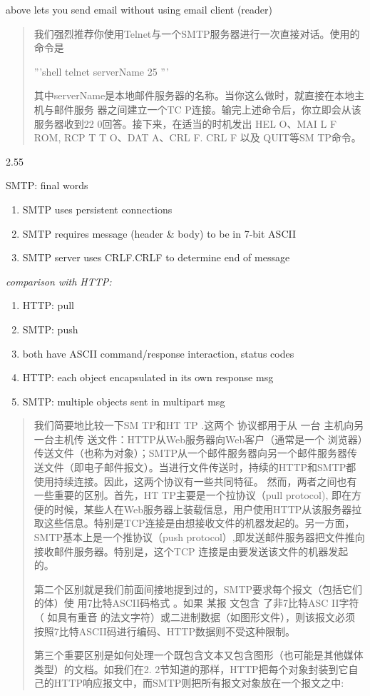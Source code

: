 \documentclass[
]{article}
\begin{document}
above lets you send email without using email client (reader)

\begin{quote}
我们强烈推荐你使用Telnet与一个SMTP服务器进行一次直接对话。使用的命令是

'''shell telnet serverName 25 '''

其中serverName是本地邮件服务器的名称。当你这么做时，就直接在本地主机与邮件服务
器之间建立一个TC P连接。输完上述命令后，你立即会从该服务器收到22
0回答。接下来，在适当的时机发出 HEL O、MAI L F ROM, RCP T T O、DAT
A、CRL F. CRL F 以及 QUIT等SM TP命令。
\end{quote}

2.55

SMTP: final words

\begin{enumerate}
\def\labelenumi{\arabic{enumi}.}
\item
  SMTP uses persistent connections
\item
  SMTP requires message (header \& body) to be in 7-bit ASCII
\item
  SMTP server uses CRLF.CRLF to determine end of message
\end{enumerate}

\emph{comparison with HTTP:}

\begin{enumerate}
\def\labelenumi{\arabic{enumi}.}
\item
  HTTP: pull
\item
  SMTP: push
\item
  both have ASCII command/response interaction, status codes
\item
  HTTP: each object encapsulated in its own response msg
\item
  SMTP: multiple objects sent in multipart msg
\end{enumerate}

\begin{quote}
我们简要地比较一下SM TP和HT TP .这两个 协议都用于从 一台
主机向另一台主机传 送文件：HTTP从Web服务器向Web客户（通常是一个
浏览器）传送文件（也称为对象）；SMTP从一个邮件服务器向另一个邮件服务器传送文件（即电子邮件报文）。当进行文件传送时，持续的HTTP和SMTP都使用持续连接。因此，这两个协议有一些共同特征。
然而，两者之间也有一些重要的区别。首先，HT TP主要是一个拉协议（pull
protocol),
即在方便的时候，某些人在Web服务器上装载信息，用户使用HTTP从该服务器拉取这些信息。特别是TCP连接是由想接收文件的机器发起的。另一方面，SMTP基本上是一个推协议（push
protocol）,即发送邮件服务器把文件推向接收邮件服务器。特别是，这个TCP
连接是由要发送该文件的机器发起的。

第二个区别就是我们前面间接地提到过的，SMTP要求每个报文（包括它们的体）使
用7比特ASCII码格式 。如果 某报 文包含 了非7比特ASC II字符（ 如具有重音
的法文字符）或二进制数据（如图形文件），则该报文必须按照7比特ASCII码进行编码、HTTP数据则不受这种限制。

第三个重要区别是如何处理一个既包含文本又包含图形（也可能是其他媒体类型）的文档。如我们在2.
2节知道的那样，HTTP把每个对象封装到它自己的HTTP响应报文中，而SMTP则把所有报文对象放在一个报文之中:
\end{quote}
\end{document}
